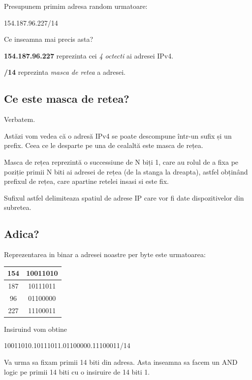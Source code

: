 \documentclass{article}
\begin{document}
Presupunem primim adresa random urmatoare:
\begin{center}
    154.187.96.227/14
\end{center}

Ce inseamna mai precis asta?

\textbf{154.187.96.227} reprezinta cei \textit{4 octecti} ai adresei IPv4.

\textbf{/14} reprezinta \textit{masca de retea} a adresei.

\subsection{Ce este masca de retea?}

Verbatem.

Astăzi vom vedea că o adresă IPv4 se poate descompune într-un sufix și un prefix. Ceea ce le desparte pe una de cealaltă este masca de rețea.

Masca de rețea reprezintă o successiune de N biți 1, care au rolul de a fixa pe poziție primii N biti ai adresei de rețea (de la stanga la dreapta), astfel obținând prefixul de rețea, care apartine retelei insasi si este fix.

Sufixul astfel delimiteaza spatiul de adrese IP care vor fi date dispozitivelor din subretea.

\subsection{Adica?}

Reprezentarea in binar a adresei noastre per byte este urmatoarea:
\begin{center}
   \begin{tabular}{|c|c|}
   \hline
        154 & 10011010 \\
    \hline
        187 & 10111011 \\
    \hline
        96  & 01100000 \\
    \hline
        227 & 11100011 \\
    \hline
    \end{tabular}
\end{center}

Insiruind vom obtine
\begin{center}
    10011010.10111011.01100000.11100011/14
\end{center}
Va urma sa fixam primii 14 biti din adresa.
Asta inseamna sa facem un AND logic pe primii 14 biti cu o insiruire de 14 biti 1.
\end{document}
